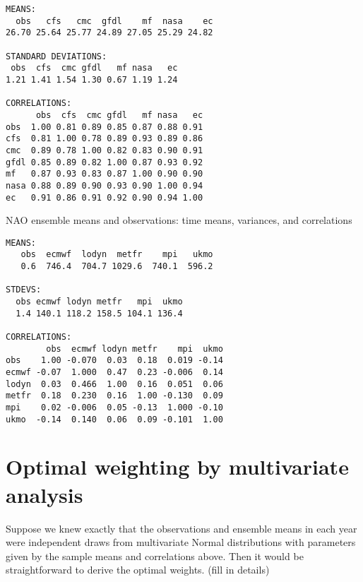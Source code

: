 \documentclass[12pt]{article}
\begin{document}
\begin{verbatim}
MEANS:
  obs   cfs   cmc  gfdl    mf  nasa    ec 
26.70 25.64 25.77 24.89 27.05 25.29 24.82 

STANDARD DEVIATIONS:
 obs  cfs  cmc gfdl   mf nasa   ec 
1.21 1.41 1.54 1.30 0.67 1.19 1.24 
 
CORRELATIONS:
      obs  cfs  cmc gfdl   mf nasa   ec
obs  1.00 0.81 0.89 0.85 0.87 0.88 0.91
cfs  0.81 1.00 0.78 0.89 0.93 0.89 0.86
cmc  0.89 0.78 1.00 0.82 0.83 0.90 0.91
gfdl 0.85 0.89 0.82 1.00 0.87 0.93 0.92
mf   0.87 0.93 0.83 0.87 1.00 0.90 0.90
nasa 0.88 0.89 0.90 0.93 0.90 1.00 0.94
ec   0.91 0.86 0.91 0.92 0.90 0.94 1.00

\end{verbatim}


NAO ensemble means and observations: time means, variances, and correlations

\begin{verbatim}
MEANS:
   obs  ecmwf  lodyn  metfr    mpi   ukmo 
   0.6  746.4  704.7 1029.6  740.1  596.2 

STDEVS:
  obs ecmwf lodyn metfr   mpi  ukmo 
  1.4 140.1 118.2 158.5 104.1 136.4 

CORRELATIONS:
        obs  ecmwf lodyn metfr    mpi  ukmo
obs    1.00 -0.070  0.03  0.18  0.019 -0.14
ecmwf -0.07  1.000  0.47  0.23 -0.006  0.14
lodyn  0.03  0.466  1.00  0.16  0.051  0.06
metfr  0.18  0.230  0.16  1.00 -0.130  0.09
mpi    0.02 -0.006  0.05 -0.13  1.000 -0.10
ukmo  -0.14  0.140  0.06  0.09 -0.101  1.00
\end{verbatim}


\section{Optimal weighting by multivariate analysis}


Suppose we knew exactly that the observations and ensemble means in each year were independent draws from multivariate Normal distributions with parameters given by the sample means and correlations above.
Then it would be straightforward to derive the optimal weights.
(fill in details)
\end{document}
